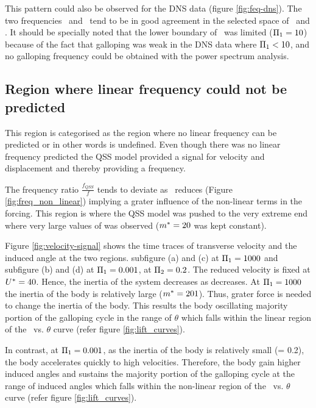 
 
 This pattern could also be observed for the DNS data (figure \ref{fig:feq-dns}). The two frequencies \freqlin\ and \freqdns\ tend to be in good agreement in the selected space of \massstiff\ and \massdamp. It should be specially noted that the lower boundary of \massstiff\ was limited ($\Pi_1=10$) because of the fact that galloping was weak in the DNS data where $\Pi_1<10$, and no galloping frequency could be obtained with the power spectrum analysis. 


\subsection{Region where linear frequency could not be predicted}

This region is categorised as the region where no linear frequency can be predicted or in other words \freqlin is undefined. Even though there was no linear frequency predicted the QSS model provided a signal for velocity and displacement and thereby providing a frequency. 



The frequency ratio $\frac{f_{QSS}}{f}$ tends to deviate as \massstiff\ reduces (Figure \ref{fig:freq_non_linear}) implying a grater influence of the non-linear terms in the forcing. This region is where the QSS model was pushed to the very extreme end where very large values of \ustar was observed ($m^{*}=20$ was kept constant). 



Figure \ref{fig:velocity-signal} shows the time traces of transverse velocity and the induced angle at the two regions. subfigure (a) and (c) at $\Pi_1=1000$ and subfigure (b) and (d) at $\Pi_1=0.001$, at $\Pi_2=0.2$. The reduced velocity is fixed at $U^{*}=40$. Hence, the inertia of the system decreases as \massstiff decreases. At $\Pi_1=1000$ the inertia of the body is relatively large ($m^{*}=201$). Thus, grater force is needed to change the inertia of the body. This results the body oscillating majority portion of the galloping cycle in the range of $\theta$ which falls within the linear region of the \cy\ vs. $\theta$ curve (refer figure \ref{fig:lift_curves}).

In contrast, at $\Pi_1=0.001$, as the inertia of the body is relatively small (\mstar= 0.2), the body accelerates quickly to high velocities. Therefore, the body gain higher induced angles and sustains the majority portion of the galloping cycle at the range of induced angles which falls within the non-linear  region of the \cy\ vs. $\theta$ curve (refer figure \ref{fig:lift_curves}). 

